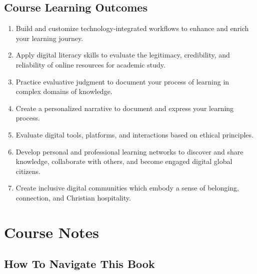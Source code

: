 \documentclass[
]{book}
\providecommand{\tightlist}{%
  \setlength{\itemsep}{0pt}\setlength{\parskip}{0pt}}
\theoremstyle{definition}
\theoremstyle{definition}
\theoremstyle{definition}
\theoremstyle{definition}
\theoremstyle{remark}
\begin{document}
\hypertarget{course-learning-outcomes}{%
\subsection*{Course Learning Outcomes}\label{course-learning-outcomes}}

\begin{enumerate}
\def\labelenumi{\arabic{enumi}.}
\tightlist
\item
  Build and customize technology-integrated workflows to enhance and enrich your learning journey.\\
\item
  Apply digital literacy skills to evaluate the legitimacy, credibility, and reliability of online resources for academic study.\\
\item
  Practice evaluative judgment to document your process of learning in complex domains of knowledge.\\
\item
  Create a personalized narrative to document and express your learning process.\\
\item
  Evaluate digital tools, platforms, and interactions based on ethical principles.\\
\item
  Develop personal and professional learning networks to discover and share knowledge, collaborate with others, and become engaged digital global citizens.\\
\item
  Create inclusive digital communities which embody a sense of belonging, connection, and Christian hospitality.
\end{enumerate}

\hypertarget{course-notes}{%
\section*{Course Notes}\label{course-notes}}

\hypertarget{how-to-navigate-this-book}{%
\subsection*{How To Navigate This Book}\label{how-to-navigate-this-book}}
\end{document}

